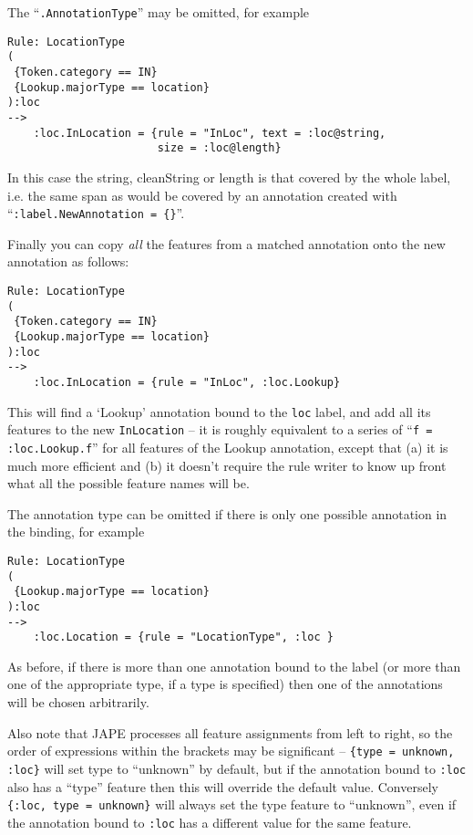 The ``\verb|.AnnotationType|'' may be omitted, for example
%
\begin{small}
\begin{verbatim}
Rule: LocationType
(
 {Token.category == IN}
 {Lookup.majorType == location}
):loc
-->
    :loc.InLocation = {rule = "InLoc", text = :loc@string,
                       size = :loc@length}
\end{verbatim}
\end{small}

In this case the string, cleanString or length is that covered by the whole
label, i.e. the same span as would be covered by an annotation created with
``\verb|:label.NewAnnotation = {}|''.

Finally you can copy \emph{all} the features from a matched annotation onto
the new annotation as follows:
%
\begin{small}
\begin{verbatim}
Rule: LocationType
(
 {Token.category == IN}
 {Lookup.majorType == location}
):loc
-->
    :loc.InLocation = {rule = "InLoc", :loc.Lookup}
\end{verbatim}
\end{small}

This will find a `Lookup' annotation bound to the \verb!loc! label, and add all
its features to the new \verb!InLocation! -- it is roughly equivalent to a
series of ``\verb!f = :loc.Lookup.f!'' for all features of the Lookup
annotation, except that (a) it is much more efficient and (b) it doesn't
require the rule writer to know up front what all the possible feature names
will be.

The annotation type can be omitted if there is only one possible annotation
in the binding, for example
%
\begin{small}
\begin{verbatim}
Rule: LocationType
(
 {Lookup.majorType == location}
):loc
-->
    :loc.Location = {rule = "LocationType", :loc }
\end{verbatim}
\end{small}

As before, if there is more than one annotation bound to the label (or more
than one of the appropriate type, if a type is specified) then one of the
annotations will be chosen arbitrarily.

Also note that JAPE processes all feature assignments from left to right,
so the order of expressions within the brackets may be significant --
\verb!{type = unknown, :loc}! will set type to ``unknown'' by default, but
if the annotation bound to \verb!:loc! also has a ``type'' feature then this
will override the default value.  Conversely \verb!{:loc, type = unknown}! will
always set the type feature to ``unknown'', even if the annotation bound to
\verb!:loc! has a different value for the same feature.

